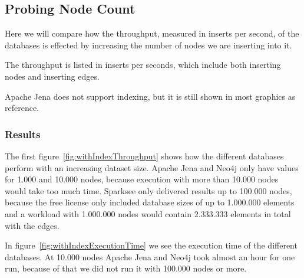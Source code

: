 \subsection{Probing Node Count}
\label{ch:evaluation:se:probingNodeCount}
Here we will compare how the throughput, measured in inserts per second,
of the databases is effected by increasing the number of nodes we are inserting into it.

The throughput is listed in inserts per seconds,
which include both inserting nodes and inserting edges.

Apache Jena does not support indexing,
but it is still shown in most graphics as reference.

\subsubsection{Results}
The first figure~\ref{fig:withIndexThroughput} shows how the different databases perform with an increasing dataset size.
Apache Jena and Neo4j only have values for 1.000 and 10.000 nodes,
because execution with more than 10.000 nodes would take too much time.
Sparksee only delivered results up to 100.000 nodes,
because the free license only included database sizes of up to 1.000.000 elements and a workload with 1.000.000 nodes would contain 2.333.333 elements in total with the edges.

In figure~\ref{fig:withIndexExecutionTime} we see the execution time of the different databases.
At 10.000 nodes Apache Jena and Neo4j took almost an hour for one run,
because of that we did not run it with 100.000 nodes or more.

